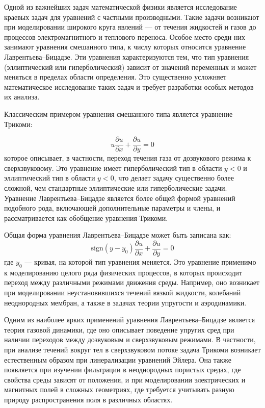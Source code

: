 \documentclass[12pt, a4paper]{article}
\begin{document}
Одной из важнейших задач математической физики является исследование краевых задач для уравнений с частными производными. Такие задачи возникают при моделировании широкого круга явлений — от течения жидкостей и газов до процессов электромагнитного и теплового переноса. Особое место среди них занимают уравнения смешанного типа, к числу которых относится уравнение Лаврентьева–Бицадзе. Эти уравнения характеризуются тем, что тип уравнения (эллиптический или гиперболический) зависит от значений переменных и может меняться в пределах области определения. Это существенно усложняет математическое исследование таких задач и требует разработки особых методов их анализа.

Классическим примером уравнения смешанного типа является уравнение Трикоми:

$$
 u \dfrac{\partial u}{\partial x} + \dfrac{\partial u}{\partial y} = 0
$$
которое описывает, в частности, переход течения газа от дозвукового режима к сверхзвуковому. Это уравнение имеет гиперболический тип в области $ y < 0$ и эллиптический тип в области $y < 0$, что делает задачу существенно более сложной, чем стандартные эллиптические или гиперболические задачи. Уравнение Лаврентьева–Бицадзе является более общей формой уравнений подобного рода, включающей дополнительные параметры и члены, и рассматривается как обобщение уравнения Трикоми.

Общая форма уравнения Лаврентьева–Бицадзе может быть записана как:
$$
	\mathrm{sign}(y-y_0) \dfrac{\partial u}{\partial x} + \dfrac{\partial u}{\partial y} = 0
$$
где $y_0$ — кривая, на которой тип уравнения меняется. Это уравнение применимо к моделированию целого ряда физических процессов, в которых происходит переход между различными режимами движения среды. Например, оно возникает при моделировании неустановившихся течений вязкой жидкости, колебаний неоднородных мембран, а также в задачах теории упругости и аэродинамики.

Одним из наиболее ярких применений уравнения Лаврентьева–Бицадзе является теория газовой динамики, где оно описывает поведение упругих сред при наличии переходов между дозвуковым и сверхзвуковым режимами. В частности, при анализе течений вокруг тел в сверхзвуковом потоке задача Трикоми возникает естественным образом при линерализации уравнений Эйлера. Она также появляется при изучении фильтрации в неоднородных пористых средах, где свойства среды зависят от положения, и при моделировании электрических и магнитных полей в сложных геометриях, где требуется учитывать разную природу распространения поля в различных областях.
\end{document}
